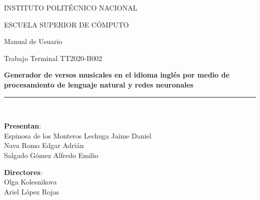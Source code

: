 \documentclass[12pt, a4paper, titlepage]{article}
\begin{document}
\begin{titlepage}
		\vspace*{.25cm}								%
		
		\begin{center}
			
			\begin{LARGE}
				\textcolor{guindapoli}{INSTITUTO POLITÉCNICO NACIONAL}\\
			\end{LARGE}	
			
			\vspace*{0.2in}
			
			\begin{Large}
				\textcolor{azulescom}{ESCUELA SUPERIOR DE CÓMPUTO}\\
			\end{Large}	
		
			\vspace*{0.4in}
			
			\begin{large}
				Manual de Usuario\\
			\end{large}	
			
			\vspace*{0.4in}
			
			\begin{large}
				Trabajo Terminal TT2020-B002\\
			\end{large}
			
			\vspace*{0.2in}
			
			\begin{Large}
				\textbf{Generador de versos musicales en el idioma
					inglés por medio de procesamiento de lenguaje
					natural y redes neuronales}\\
			\end{Large}
						
			\vspace*{0.2in}
			
			\rule{80mm}{.1mm}\\
			\vspace*{0.1in}
			
			\begin{large}
				\begin{center}
					\textbf{Presentan}:\\
					Espinosa de los Monteros Lechuga Jaime Daniel\\
					Nava Romo Edgar Adrián\\
					Salgado Gómez Alfredo Emilio\\
				\end{center}
			\end{large}
			
			\begin{large}
				\textbf{Directores}:\\
				Olga Kolesnikova\\
				Ariel López Rojas\\
			\end{large}
			
		\end{center}
		
	\end{titlepage}
	
\end{document}
